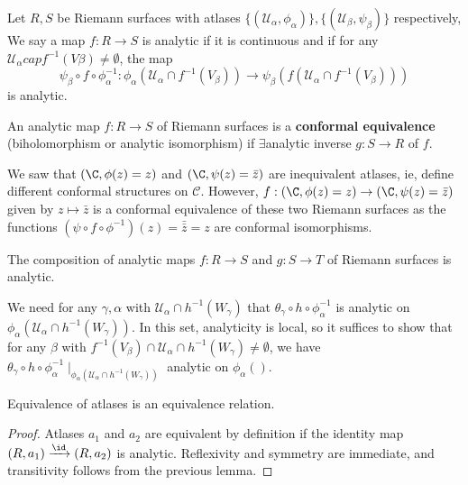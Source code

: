 \documentclass{article}
\begin{document}
\begin{defi}
    Let $R, S$ be Riemann surfaces with atlases $\{(\mathcal{U}_\alpha, \phi_\alpha)\}, \{(\mathcal{U}_\beta, \psi_\beta)\}$ respectively, We say a map $f: R \to S$ is analytic if it is continuous and if for any $\mathcal{U}_\alpha cap f^{-1}(V \beta) \neq \emptyset$, the map
    \begin{equation}
        \psi_\beta \circ f \circ \phi_\alpha^{-1}: \phi_\alpha(\mathcal{U}_\alpha \cap f^{-1}(V_\beta)) \to \psi_\beta(f(\mathcal{U}_\alpha \cap f^{-1}(V_\beta)))
    \end{equation}
    is analytic.
\end{defi}

\begin{defi}
    An analytic map $f: R \to S$ of Riemann surfaces is a \textbf{conformal equivalence} (biholomorphism or analytic isomorphism) if $\exists$analytic inverse $g:S \to R$ of $f$.
\end{defi}

\begin{eg}
    We saw that $(\C, \phi(z) = z)$ and $(\C, \psi(z) = \bar{z})$ are inequivalent atlases, ie, define different conformal structures on $\mathcal{C}$. However, $f:(\C, \phi(z) = z) \to (\C, \psi(z) = \bar{z})$ given by $z \mapsto \bar{z}$ is a conformal equivalence of these two Riemann surfaces as the functions $(\psi \circ f \circ \phi^{-1})(z) = \bar{\bar{z}} = z$ are conformal isomorphisms.
\end{eg}

\begin{lemma}
    The composition of analytic maps $f: R\to S$ and $g: S \to T$ of Riemann surfaces is analytic.
\end{lemma}

We need for any $\gamma, \alpha$ with $\mathcal{U}_\alpha \cap h^{-1}(W_\gamma)$ that $\theta_\gamma \circ h \circ \phi_\alpha^{-1}$ is analytic on $\phi_\alpha(\mathcal{U}_\alpha \cap h^{-1}(W_\gamma))$.
In this set, analyticity is local, so it suffices to show that for any $\beta$ with $f^{-1}(V_\beta) \cap \mathcal{U}_\alpha \cap h^{-1}(W_\gamma) \neq \emptyset$, we have $\theta_\gamma \circ h \circ \phi_\alpha^{-1} \mid_{\phi_\alpha(\mathcal{U}_\alpha \cap h^{-1}(W_\gamma))}$ analytic on $\phi_\alpha()$.

\begin{cor}
    Equivalence of atlases is an equivalence relation.
\end{cor}

\begin{proof}
    Atlases $a_1$ and $a_2$ are equivalent by definition if the identity map $(R, a_1) \xrightarrow{\id} (R, a_2)$ is analytic. Reflexivity and symmetry are immediate, and transitivity follows from the previous lemma.
\end{proof}
\end{document}
